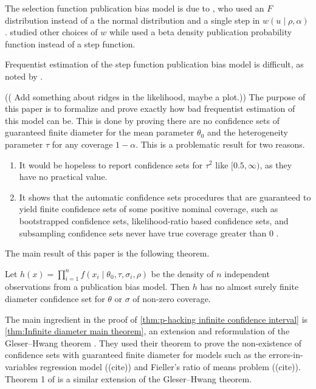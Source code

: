 \documentclass[twoside]{article}
\begin{document}
The selection function publication bias model is due to \citet{hedges1984estimation},
who used an $F$ distribution instead of a the normal distribution
and a single step in $w(u\mid\rho,\alpha)$. \citet{iyengar1988selection}
studied other choices of $w$ while \citet{citkowicz2017parsimonious}
used a beta density publication probability function instead of a
step function. 

Frequentist estimation of the step function publication bias model
is difficult, as noted by \citet[Appendix 1]{mcshane2016adjusting}.

(( Add something about ridges in the likelihood, maybe a plot.))
The purpose of this paper is to formalize and prove exactly how bad frequentist estimation of this model can be. This is done by proving there are no confidence sets of guaranteed finite diameter for the mean parameter $\theta_{0}$
and the heterogeneity parameter $\tau$ for any coverage $1-\alpha$.
This is a problematic result for two reasons. 
\begin{enumerate}[label=(\roman*)]
\item It would be hopeless to report confidence sets for $\tau^{2}$ like $[0.5,\infty)$, as they have no practical value. 
\item It shows that the automatic confidence
sets procedures that are guaranteed to yield finite confidence sets
of some positive nominal coverage, such as bootstrapped confidence
sets, likelihood-ratio based confidence sets, and subsampling confidence
sets never have true coverage greater than $0$ \citep[see][]{gleser996bootstrap}.
\end{enumerate}
The main result of this paper is the following theorem.
\begin{thm}
\label{thm:p-hacking infinite confidence interval}Let $h(x)=\prod_{i=1}^{n}f(x_{i}\mid\theta_{0},\tau,\sigma_{i},\rho)$ be the density of $n$ independent observations from a publication bias model. Then $h$ has no almost surely finite diameter confidence set for $\theta$ or $\sigma$ of non-zero coverage.
\end{thm}

The main ingredient in the proof of \cref{thm:p-hacking infinite confidence interval}
is \cref{thm:Infinite diameter main theorem}, an extension
and reformulation of the Gleser--Hwang theorem \citep{gleser1987nonexistence}. 
They used their theorem to prove the non-existence of confidence sets with
guaranteed finite diameter for models such as the errors-in-variables
regression model ((cite)) and Fieller's ratio of means problem ((cite)). Theorem 1 of \citet{berger1999integrated}
is a similar extension of the Gleser--Hwang theorem.
\end{document}
